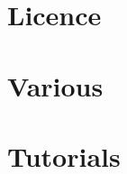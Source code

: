 \let\mypdfximage\pdfximage\def\pdfximage{\immediate\mypdfximage}\documentclass[twoside]{book}
\newcommand{\+}{\discretionary{\mbox{\scriptsize$\hookleftarrow$}}{}{}}
\newcommand{\clearemptydoublepage}{%
  \newpage{\pagestyle{empty}\cleardoublepage}%
}
\begin{document}
\chapter{Licence}
\label{md_pages_old_various_license}

\chapter{Various}
\label{md_pages_old_various}

\chapter{Tutorials}
\label{md_pages_tutorials}


\backmatter
\newpage
{}
\clearemptydoublepage
{}
\printindex
\end{document}

